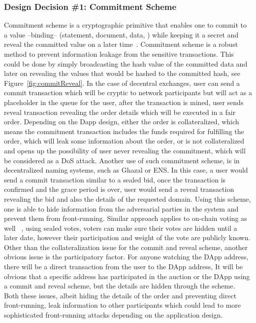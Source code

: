 \subsubsection{Design Decision \#1: Commitment Scheme\newline} %
Commitment scheme is a cryptographic primitive that enables one to commit to a value --binding-- (\eg statement, document, data, \etc) while keeping it a secret and reveal the committed value on a later time~\cite{brassard1988minimum}. Commitment scheme is a robust method to prevent information leakage from the sensitive transactions. This could be done by simply broadcasting the hash value of the committed data and later on revealing the values that would be hashed to the committed hash, see Figure~\ref{fig:commitReveal}. 
In the case of decentral exchanges, user can send a commit transaction which will be cryptic to network participants but will act as a placeholder in the queue for the user, after the transaction is mined, user sends reveal transaction revealing the order details which will be executed in a fair order. Depending on the Dapp design, either the order is collateralized, which means the commitment transaction includes the funds required for fulfilling the order, which will leak some information about the order, or is not collateralized and opens up the possibility of user never revealing the commitment, which will be considered as a DoS attack. 
Another use of such commitment scheme, is in decentralized naming systems, such as Ghazal or ENS. In this case, a user would send a commit transaction similar to a sealed bid, once the transaction is confirmed and the grace period is over, user would send a reveal transaction revealing the bid and also the details of the requested domain. Using this scheme, one is able to hide information from the adversarial parties in the system and prevent them from front-running. Similar approach applies to on-chain voting as well ~\cite{adChainPLCRVoting}, using sealed votes, voters can make sure their votes are hidden until a later date, however their participation and weight of the vote are publicly known. 
Other than the collateralization issue for the commit and reveal scheme, another obvious issue is the participatory factor. For anyone watching the DApp address, there will be a direct transaction from the user to the DApp address, It will be obvious that a specific address has participated in the auction or the DApp using a commit and reveal scheme, but the details are hidden through the scheme. Both these issues, albeit hiding the details of the order and preventing direct front-running, leak information to other participants which could lead to more sophisticated front-running attacks depending on the application design.

